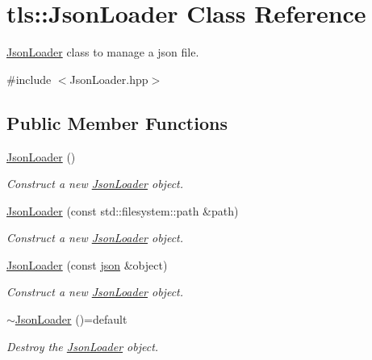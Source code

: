 \hypertarget{classtls_1_1_json_loader}{}\section{tls\+:\+:Json\+Loader Class Reference}
\label{classtls_1_1_json_loader}


\hyperlink{classtls_1_1_json_loader}{Json\+Loader} class to manage a json file.  




{\ttfamily \#include $<$Json\+Loader.\+hpp$>$}

\subsection*{Public Member Functions}
\begin{DoxyCompactItemize}
\item 
\hyperlink{classtls_1_1_json_loader_a9f9fc1f46e82b4f377b22c8acf0f3b9d}{Json\+Loader} ()
\begin{DoxyCompactList}\small\item\em Construct a new \hyperlink{classtls_1_1_json_loader}{Json\+Loader} object. \end{DoxyCompactList}\item 
\hyperlink{classtls_1_1_json_loader_ad6ec799a31fbae8ea01a9d6c278ad6e3}{Json\+Loader} (const std\+::filesystem\+::path \&path)
\begin{DoxyCompactList}\small\item\em Construct a new \hyperlink{classtls_1_1_json_loader}{Json\+Loader} object. \end{DoxyCompactList}\item 
\hyperlink{classtls_1_1_json_loader_a0826d5c9480c38d010fe580101d916e0}{Json\+Loader} (const \hyperlink{namespacetls_a4e8d32383e204ee25990db65651ea712}{json} \&object)
\begin{DoxyCompactList}\small\item\em Construct a new \hyperlink{classtls_1_1_json_loader}{Json\+Loader} object. \end{DoxyCompactList}\item 
\hyperlink{classtls_1_1_json_loader_a2d493a7049c70e6974a3daf2ef2e71f9}{$\sim$\+Json\+Loader} ()=default
\begin{DoxyCompactList}\small\item\em Destroy the \hyperlink{classtls_1_1_json_loader}{Json\+Loader} object. \end{DoxyCompactList}\item 

\end{DoxyCompactItemize}

